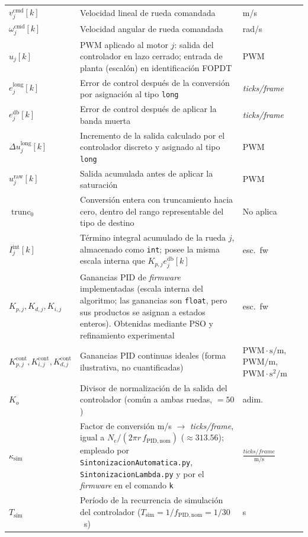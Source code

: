 \begin{appendices}
{\begin{longtable}{p{2.7cm} p{8.5cm} p{2.2cm}}
$v_j^{\mathrm{cmd}}[k]$ & Velocidad lineal de rueda comandada & m/s \\
$\omega_j^{\mathrm{cmd}}[k]$ & Velocidad angular de rueda comandada & rad/s \\
$u_j[k]$ & PWM aplicado al motor $j$: salida del controlador en lazo cerrado; entrada de planta (escalón) en identificación FOPDT & PWM \\
$e_j^{\mathrm{long}}[k]$ & Error de control después de la conversión por asignación al tipo \texttt{long} & \textit{ticks/frame} \\
$e_j^{\mathrm{db}}[k]$ & Error de control después de aplicar la banda muerta & \textit{ticks/frame} \\
$\Delta u_j^{\mathrm{long}}[k]$ & Incremento de la salida calculado por el controlador discreto y asignado al tipo \texttt{long} & PWM \\
$u_j^{\mathrm{raw}}[k]$ & Salida acumulada antes de aplicar la saturación & PWM \\
$\operatorname{trunc}_0$ & Conversión entera con truncamiento hacia cero, dentro del rango representable del tipo de destino & No aplica \\
$I_j^{\mathrm{int}}[k]$ & Término integral acumulado de la rueda $j$, almacenado como \texttt{int}; posee la misma escala interna que $K_{p,j}e_j^{\mathrm{db}}[k]$ & esc.\ fw \\
$K_{p,j},K_{d,j},K_{i,j}$ & Ganancias PID de \textit{firmware} implementadas (escala interna del algoritmo; las ganancias son \texttt{float}, pero sus productos se asignan a estados enteros). Obtenidas mediante PSO y refinamiento experimental & esc.\ fw \\
$K_{p,j}^{\mathrm{cont}},K_{i,j}^{\mathrm{cont}},K_{d,j}^{\mathrm{cont}}$ & Ganancias PID continuas ideales (forma ilustrativa, no cuantificadas) & $\mathrm{PWM\cdot s/m}$,\ $\mathrm{PWM/m}$,\ $\mathrm{PWM\cdot s^{2}/m}$ \\
$K_o$ & Divisor de normalización de la salida del controlador (común a ambas ruedas, $=50$) & adim. \\
$\kappa_{\mathrm{sim}}$ & Factor de conversión m/s $\to$ \textit{ticks/frame}, igual a $N_e/(2\pi r\,f_{\mathrm{PID,nom}})$ ($\approx313.56$); empleado por \texttt{SintonizacionAutomatica.py}, \texttt{SintonizacionLambda.py} y por el \textit{firmware} en el comando \texttt{k} & $\frac{\textit{ticks/frame}}{\text{m/s}}$ \\
$T_{\mathrm{sim}}$ & Período de la recurrencia de simulación del controlador ($T_{\mathrm{sim}}=1/f_{\mathrm{PID,nom}}=1/30$~s) & s \\

\end{longtable}}
\end{appendices}

